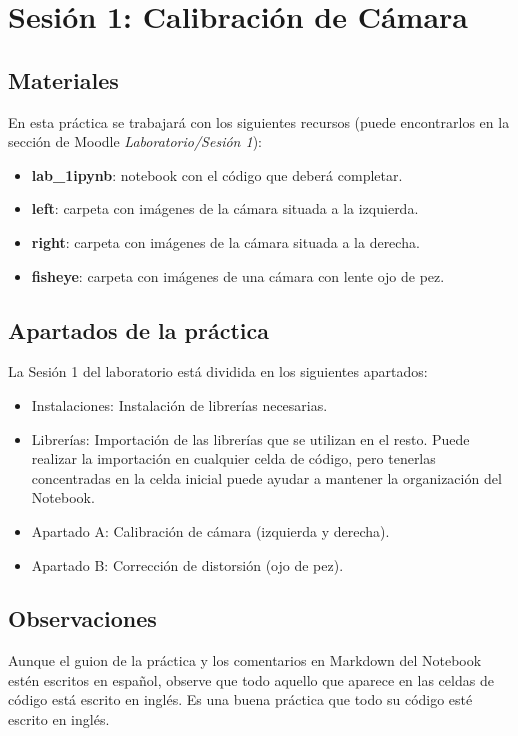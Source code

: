 \chapter{Sesión 1: Calibración de Cámara}
\label{chapter:introduction_ses_1}

\section{Materiales}
En esta práctica se trabajará con los siguientes recursos (puede encontrarlos en la sección de Moodle \textit{Laboratorio/Sesión 1}):

\begin{itemize}
    \item \textbf{lab\_1ipynb}: notebook con el código que deberá completar.
    \item \textbf{left}: carpeta con imágenes de la cámara situada a la izquierda.
    \item \textbf{right}: carpeta con imágenes de la cámara situada a la derecha.
    \item \textbf{fisheye}: carpeta con imágenes de una cámara con lente ojo de pez.
\end{itemize}

\section{Apartados de la práctica}
La Sesión 1 del laboratorio está dividida en los siguientes apartados:

\begin{itemize}
    \item Instalaciones: Instalación de librerías necesarias.
    \item Librerías: Importación de las librerías que se utilizan en el resto. Puede realizar la importación en cualquier celda de código, pero tenerlas concentradas en la celda inicial puede ayudar a mantener la organización del Notebook.
    \item Apartado A: Calibración de cámara (izquierda y derecha).
    \item Apartado B:  Corrección de distorsión (ojo de pez).
\end{itemize}

\section{Observaciones}
Aunque el guion de la práctica y los comentarios en Markdown del Notebook estén escritos en español, observe que todo aquello que aparece en las celdas de código está escrito en inglés. Es una buena práctica que todo su código esté escrito en inglés.

